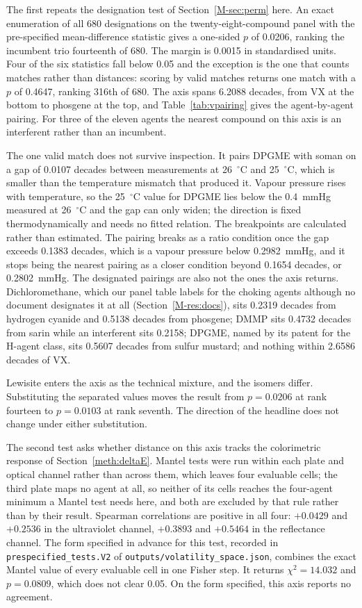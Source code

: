 \documentclass[11pt,a4paper]{article}
\begin{document}
The first repeats the designation test of Section~\ref{M-sec:perm} here. An
exact enumeration of all 680 designations on the twenty-eight-compound panel
with the pre-specified mean-difference statistic gives a one-sided $p$ of
0.0206, ranking the incumbent trio fourteenth of 680. The margin is 0.0015 in
standardised units. Four of the six statistics fall below 0.05 and the exception
is the one that counts matches rather than distances: scoring by valid matches
returns one match with a $p$ of 0.4647, ranking 316th of 680. The axis spans
6.2088 decades, from VX at the bottom to phosgene at the top, and
Table~\ref{tab:vpairing} gives the agent-by-agent pairing. For three of the
eleven agents the nearest compound on this axis is an interferent rather than an
incumbent.

The one valid match does not survive inspection. It pairs DPGME with soman on a
gap of 0.0107 decades between measurements at 26~$^{\circ}$C and
25~$^{\circ}$C, which is smaller than the temperature mismatch that produced it.
Vapour pressure rises with temperature, so the 25~$^{\circ}$C value for DPGME
lies below the 0.4~mmHg measured at 26~$^{\circ}$C and the gap can only widen;
the direction is fixed thermodynamically and needs no fitted relation. The
breakpoints are calculated rather than estimated. The pairing breaks as a ratio
condition once the gap exceeds 0.1383 decades, which is a vapour pressure below
0.2982~mmHg, and it stops being the nearest pairing as a closer condition beyond
0.1654 decades, or 0.2802~mmHg. The designated pairings are also not the ones
the axis returns. Dichloromethane, which our panel table labels for the choking
agents although no document designates it at all (Section~\ref{M-res:docs}),
sits 0.2319 decades
from hydrogen cyanide and 0.5138 decades from phosgene; DMMP sits
0.4732 decades from sarin while an interferent sits 0.2158; DPGME, named by its
patent for the H-agent class, sits 0.5607 decades from sulfur
mustard; and nothing within 2.6586 decades of VX.

Lewisite enters the axis as the technical mixture, and the isomers differ.
Substituting the separated values moves the result from $p = 0.0206$ at rank
fourteen to $p = 0.0103$ at rank seventh. The direction of the headline does not
change under either substitution.

The second test asks whether distance on this axis tracks the colorimetric
response of Section~\ref{meth:deltaE}. Mantel tests were run within each plate
and optical channel rather than across them, which leaves four evaluable cells;
the third plate maps no agent at all, so neither of its cells reaches the
four-agent minimum a Mantel test needs here, and both are excluded by that rule
rather than by their result. Spearman correlations are positive in all
four: $+0.0429$ and $+0.2536$ in the ultraviolet channel, $+0.3893$ and
$+0.5464$ in the reflectance channel. The form specified in advance for this
test, recorded in \texttt{prespecified\_tests.V2} of
\texttt{outputs/volatility\_space.json}, combines the exact Mantel value of
every evaluable cell in one Fisher step. It returns $\chi^2 = 14.032$ and
$p = 0.0809$, which does not clear 0.05. On the form specified, this axis
reports no agreement.
\end{document}
